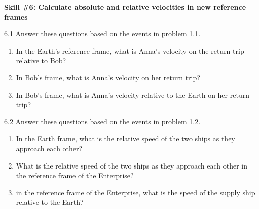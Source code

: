 \pagebreak

\textbf{Skill \#6: Calculate absolute and relative velocities in new reference frames}

6.1 Answer these questions based on the events in problem 1.1.
\begin{enumerate}[nosep,label=(\emph{\alph*})]
\item In the Earth's reference frame, what is Anna's velocity on the return trip relative to Bob?
\answerspace{0.8in}

\item In Bob's frame, what is Anna's velocity on her return trip?
\answerspace{0.8in}

\item In Bob's frame, what is Anna's velocity relative to the Earth on her return trip?
\answerspace{0.8in}

\end{enumerate}

6.2 Answer these questions based on the events in problem 1.2.
\begin{enumerate}[nosep,label=(\emph{\alph*})]
\item In the Earth frame, what is the relative speed of the two ships as they approach each other?
\answerspace{0.8in}

\item What is the relative speed of the two ships as they approach each other in the reference frame of the Enterprise?
\answerspace{0.8in}

\item in the reference frame of the Enterprise, what is the speed of the supply ship relative to the Earth?
\answerspace{0.8in}
\end{enumerate}

